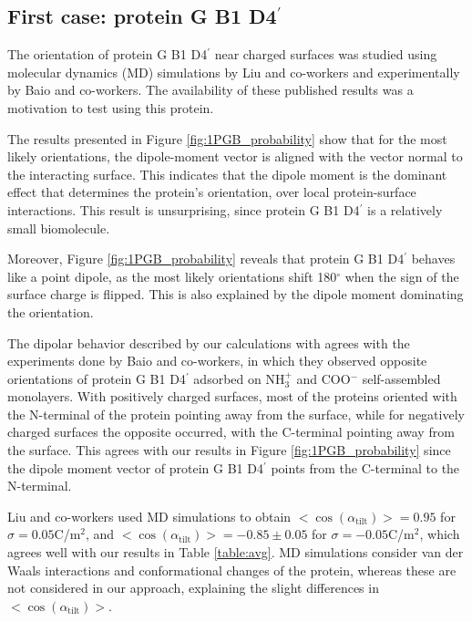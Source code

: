
\subsection{First case: protein G B1 D4$^\prime$} \label{sec:disc_1PGB}

The orientation of protein G B1 D4$^\prime$ near charged surfaces was studied using molecular dynamics (MD) simulations by Liu and co-workers\cite{LiuLiaoZhou2013} and  experimentally by Baio and co-workers.\cite{BaioWeidnerBaughGambleStaytonCastner2012} The availability of these published results was a motivation to test \pygbe using this protein. 

The results presented in Figure \ref{fig:1PGB_probability} show that for the most likely orientations, the dipole-moment vector is aligned with the vector normal to the interacting surface. This indicates that the dipole moment is the dominant effect that determines the protein's orientation, over local protein-surface  interactions. This result is unsurprising, since protein G B1 D4$^\prime$ is a relatively small biomolecule. 

Moreover, Figure \ref{fig:1PGB_probability} reveals that protein G B1 D4$^\prime$ behaves like a point dipole, as the most likely orientations shift 180$^\circ$ when the sign of the surface charge is flipped. This is also explained by the dipole moment dominating the orientation.

The dipolar behavior described by our calculations with \pygbe agrees with the experiments done by Baio and co-workers, \cite{BaioWeidnerBaughGambleStaytonCastner2012} in which they observed opposite orientations of protein G B1 D4$^\prime$ adsorbed on NH$_3^+$ and COO$^-$ self-assembled monolayers. With positively charged surfaces, most of the proteins oriented with the N-terminal of the protein pointing away from the surface, while for negatively charged surfaces the opposite occurred, with the C-terminal pointing away from the surface. This agrees with our results in Figure \ref{fig:1PGB_probability} since the dipole moment vector of protein G B1 D4$^\prime$ points from the C-terminal to the N-terminal.

Liu and co-workers \cite{LiuLiaoZhou2013} used MD simulations to obtain $<\cos(\alpha_{\text{tilt}})>=0.95$ for $\sigma = 0.05$C/m$^2$, and $<\cos(\alpha_{\text{tilt}})>=-0.85\pm0.05$ for $\sigma = -0.05$C/m$^2$, which agrees well with our results in Table \ref{table:avg}. MD simulations consider van der Waals interactions and conformational changes of the protein, whereas these are not considered in our approach, explaining the slight differences in $<\cos(\alpha_{\text{tilt}})>$.


